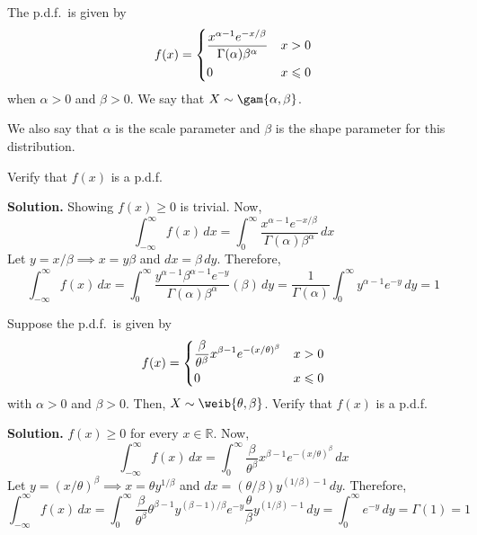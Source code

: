 \begin{Example}{}{}
    The p.d.f.\ is given by
    \[ f(x)=\begin{dcases}
            \frac{x^{\alpha-1}e^{-x/\beta}}{\Gamma(\alpha)\beta^\alpha} & x>0          \\
            0                                                           & x\leqslant 0
        \end{dcases}
    \]
    when $ \alpha>0 $ and $ \beta>0 $. We say that $ X \sim \gam{\alpha,\beta} $.

    We also say that $ \alpha $ is the scale parameter and $ \beta $ is the shape parameter
    for this distribution.

    Verify that $ f(x) $ is a p.d.f.

    \textbf{Solution.} Showing $ f(x)\geqslant 0 $ is trivial. Now,
    \[ \int_{-\infty}^{\infty} f(x)\, d{x} =
        \int_{0}^{\infty} \frac{x^{\alpha-1}e^{-x/\beta}}{\Gamma(\alpha)
        \beta^{\alpha}} \, d{x}  \]
    Let $ y=x/\beta\implies x=y\beta $ and $ dx=\beta\,dy $.
    Therefore,
    \[\int_{-\infty}^{\infty} f(x)\, d{x} =\int_{0}^{\infty}
        \frac{y^{\alpha-1}\beta^{\alpha-1}e^{-y}}{\Gamma(\alpha)\beta^\alpha}(\beta)  \, d{y}
        =\frac{1}{\Gamma(\alpha)}\int_{0}^{\infty} y^{\alpha-1}e^{-y}\, d{y}=1    \]
\end{Example}

\begin{Example}{}{}
    Suppose the p.d.f.\ is given by
    \[ f(x)=\begin{dcases}
            \frac{\beta}{\theta^\beta}x^{\beta-1}e^{-\left( x/\theta  \right)^\beta} & x>0          \\
            0                                                                        & x\leqslant 0
        \end{dcases} \]
    with $ \alpha>0 $ and $ \beta>0 $.
    Then, $ X \sim \weib{\theta,\beta} $.
    Verify that $ f(x) $ is a p.d.f.

    \textbf{Solution.} $ f(x)\geqslant 0 $ for every $ x\in\mathbb{R} $. Now,
    \[ \int_{-\infty}^{\infty} f(x)\, d{x} =
        \int_{0}^{\infty} \frac{\beta}{\theta^\beta}x^{\beta-1}e^{-\left( x/\theta  \right)^\beta} \, d{x} \]
    Let $ y=(x/\theta)^\beta \implies
        x=\theta y^{1/\beta} $ and $ dx=(\theta/\beta) y^{(1/\beta)-1}\,dy $.
    Therefore,
    \[ \int_{-\infty}^{\infty} f(x)\, d{x}=\int_{0}^{\infty} \frac{\beta}{\theta^\beta} \theta^{\beta-1}
        y^{(\beta-1)/\beta}e^{-y}\frac{\theta}{\beta} y^{(1/\beta)-1}\, d{y}
        =\int_{0}^{\infty} e^{-y}\, d{y}=\Gamma(1)=1  \]
\end{Example}

